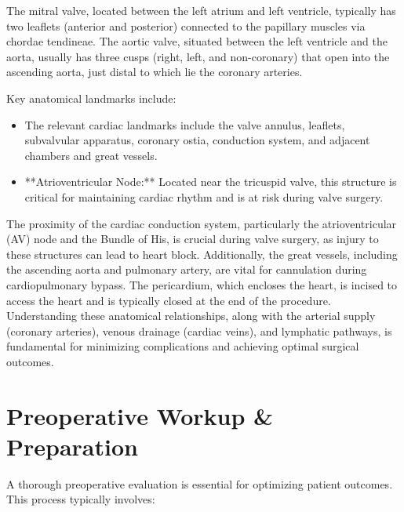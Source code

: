 The mitral valve, located between the left atrium and left ventricle, typically has two leaflets (anterior and posterior) connected to the papillary muscles via chordae tendineae. The aortic valve, situated between the left ventricle and the aorta, usually has three cusps (right, left, and non-coronary) that open into the ascending aorta, just distal to which lie the coronary arteries.

Key anatomical landmarks include:

\begin{itemize}
  \item The relevant cardiac landmarks include the valve annulus, leaflets, subvalvular apparatus, coronary ostia, conduction system, and adjacent chambers and great vessels.
  \item **Atrioventricular Node:** Located near the tricuspid valve, this structure is critical for maintaining cardiac rhythm and is at risk during valve surgery.
\end{itemize}

The proximity of the cardiac conduction system, particularly the atrioventricular (AV) node and the Bundle of His, is crucial during valve surgery, as injury to these structures can lead to heart block. Additionally, the great vessels, including the ascending aorta and pulmonary artery, are vital for cannulation during cardiopulmonary bypass. The pericardium, which encloses the heart, is incised to access the heart and is typically closed at the end of the procedure. Understanding these anatomical relationships, along with the arterial supply (coronary arteries), venous drainage (cardiac veins), and lymphatic pathways, is fundamental for minimizing complications and achieving optimal surgical outcomes.

\section*{Preoperative Workup \& Preparation}
A thorough preoperative evaluation is essential for optimizing patient outcomes. This process typically involves:


